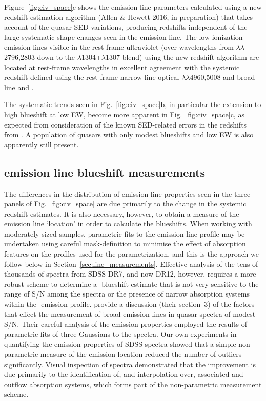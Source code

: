 Figure~\ref{fig:civ_space}c shows the  emission line parameters calculated using a new redshift-estimation algorithm (Allen \& Hewett 2016, in preparation) that takes account of the quasar SED variations, producing redshifts independent of the large systematic shape changes seen in the  emission line. 
The low-ionization emission lines visible in the rest-frame ultraviolet (over wavelengths from $\lambda\lambda$2796,2803 down to the $\lambda$1304+$\lambda$1307 blend) using the new redshift-algorithm are located at rest-frame wavelengths in excellent agreement with the systemic redshift defined using the rest-frame narrow-line optical $\lambda\lambda$4960,5008 and broad-line \hb and \hans.

The systematic trends seen in Fig.~\ref{fig:civ_space}b, in particular the extension to high blueshift at low  EW, become more apparent in Fig.~\ref{fig:civ_space}c, as expected from consideration of the known SED-related errors in the redshifts from \citet{hewett10}.
A population of quasars with only modest blueshifts and low EW is also apparently still present. 

\subsection{ emission line blueshift measurements}
\label{sec:civmeasure}

The differences in the distribution of  emission line properties seen in the three panels of Fig.~\ref{fig:civ_space} are due primarily to the change in the systemic redshift estimates. 
It is also necessary, however, to obtain a measure of the  emission line `location' in order to calculate the blueshifts. 
When working with moderately-sized samples, parametric fits to the emission-line profile may be undertaken using careful mask-definition to minimise the effect of absorption features on the profiles used for the parametrization, and this is the approach we follow below in Section~\ref{sec:line_measurements}. 
Effective analysis of the tens of thousands of spectra from SDSS DR7, and now DR12, however, requires a more robust scheme to determine a -blueshift estimate that is not very sensitive to the range of S/N among the spectra or the presence of narrow absorption systems within the -emission profile. 
\citet{shen11} provide a discussion (their section~3) of the factors that effect the measurement of broad emission lines in quasar spectra of modest S/N. 
Their careful analysis of the  emission properties employed the results of parametric fits of three Gaussians to the spectra. 
Our own experiments in quantifying the  emission properties of SDSS spectra showed that a simple non-parametric measure of the  emission location reduced the number of outliers significantly. 
Visual inspection of spectra demonstrated that the improvement is due primarily to the identification of, and interpolation over, associated and outflow absorption systems, which forms part of the non-parametric measurement scheme. 

